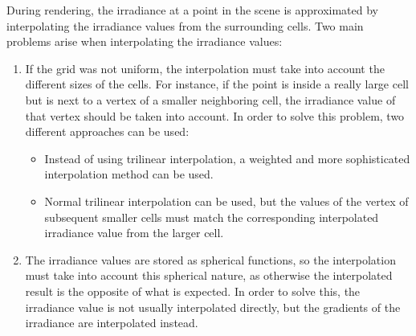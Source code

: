 During rendering, the irradiance at a point in the scene is approximated by interpolating the irradiance values from the surrounding cells. Two main problems arise when interpolating the irradiance values:
\begin{enumerate}
    \item If the grid was not uniform, the interpolation must take into account the different sizes of the cells. For instance, if the point is inside a really large cell but is next to a vertex of a smaller neighboring cell, the irradiance value of that vertex should be taken into account. In order to solve this problem, two different approaches can be used:
    \begin{itemize}
        \item Instead of using trilinear interpolation, a weighted and more sophisticated interpolation method can be used.
        \item Normal trilinear interpolation can be used, but the values of the vertex of subsequent smaller cells must match the corresponding interpolated irradiance value from the larger cell.
    \end{itemize}
    \item The irradiance values are stored as spherical functions, so the interpolation must take into account this spherical nature, as otherwise the interpolated result is the opposite of what is expected. In order to solve this, the irradiance value is not usually interpolated directly, but the gradients of the irradiance are interpolated instead.
\end{enumerate}

    
    
